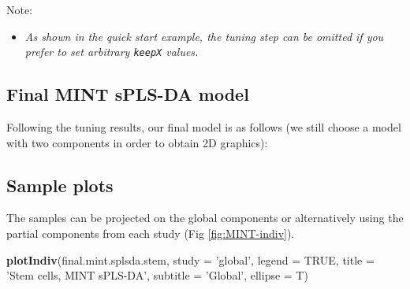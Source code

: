\documentclass[]{book}
\newenvironment{Shaded}{\begin{snugshade}}{\end{snugshade}}
\newcommand{\KeywordTok}[1]{\textcolor[rgb]{0.13,0.29,0.53}{\textbf{#1}}}
\newcommand{\DataTypeTok}[1]{\textcolor[rgb]{0.13,0.29,0.53}{#1}}
\newcommand{\DecValTok}[1]{\textcolor[rgb]{0.00,0.00,0.81}{#1}}
\newcommand{\StringTok}[1]{\textcolor[rgb]{0.31,0.60,0.02}{#1}}
\newcommand{\CommentTok}[1]{\textcolor[rgb]{0.56,0.35,0.01}{\textit{#1}}}
\newcommand{\OtherTok}[1]{\textcolor[rgb]{0.56,0.35,0.01}{#1}}
\newcommand{\OperatorTok}[1]{\textcolor[rgb]{0.81,0.36,0.00}{\textbf{#1}}}
\newcommand{\NormalTok}[1]{#1}
\providecommand{\tightlist}{%
  \setlength{\itemsep}{0pt}\setlength{\parskip}{0pt}}
\begin{document}
Note:

\begin{itemize}
\tightlist
\item
  \emph{As shown in the quick start example, the tuning step can be
  omitted if you prefer to set arbitrary \texttt{keepX} values.}
\end{itemize}

\subsection{Final MINT sPLS-DA model}\label{final-mint-spls-da-model}

Following the tuning results, our final model is as follows (we still
choose a model with two components in order to obtain 2D graphics):

\begin{Shaded}
\end{Shaded}

\subsection{Sample plots}\label{mint:result:ncomp}

The samples can be projected on the global components or alternatively
using the partial components from each study (Fig \ref{fig:MINT-indiv}).

\begin{Shaded}
\begin{Highlighting}[]
\KeywordTok{plotIndiv}\NormalTok{(final.mint.splsda.stem, }\DataTypeTok{study =} \StringTok{'global'}\NormalTok{, }\DataTypeTok{legend =} \OtherTok{TRUE}\NormalTok{, }
          \DataTypeTok{title =} \StringTok{'Stem cells, MINT sPLS-DA'}\NormalTok{, }
          \DataTypeTok{subtitle =} \StringTok{'Global'}\NormalTok{, }\DataTypeTok{ellipse =}\NormalTok{ T)}
\end{Highlighting}
\end{Shaded}
\end{document}

